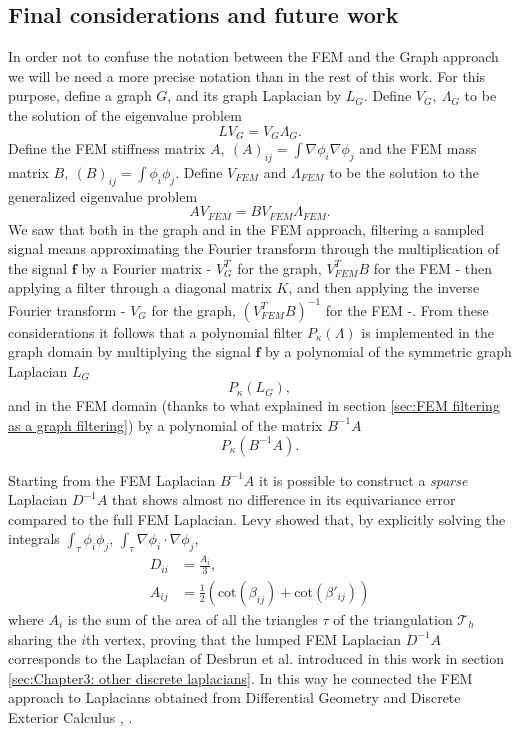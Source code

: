 \subsection{Final considerations and future work}
In order not to confuse the notation between the FEM and the Graph approach we will be need a more precise notation than in the rest of this work. For this purpose, define a graph $G$, and its graph Laplacian by $L_G$. Define $V_G,\ \Lambda_G$ to be the solution of the eigenvalue problem
$$
L V_G = V_G \Lambda_G.
$$
Define the FEM stiffness matrix $A,\ (A)_{ij} = \int\nabla\phi_i\nabla\phi_j$ and the FEM mass matrix $B,\ (B)_{ij} = \int\phi_i\phi_j$. Define $V_{FEM}$ and $\Lambda_{FEM}$ to be the solution to the generalized eigenvalue problem 
$$
AV_{FEM} = BV_{FEM}\Lambda_{FEM}.
$$
We saw that both in the graph and in the FEM approach, filtering a sampled signal means approximating the Fourier transform through the multiplication of the signal $\mathbf f$ by a Fourier matrix - $V_G^T$ for the graph, $V_{FEM}^TB$ for the FEM - then applying a filter through a diagonal matrix $K$, and then applying the inverse Fourier transform - $V_G$ for the graph, $(V_{FEM}^TB)^{-1}$ for the FEM -. From these considerations it follows that a polynomial filter $P_\kappa(\Lambda)$ is implemented in the graph domain by multiplying the signal $\mathbf f$ by a polynomial of the symmetric graph Laplacian $L_G$
$$
P_\kappa(L_G),
$$
and in the FEM domain (thanks to what explained in section \ref{sec:FEM filtering as a graph filtering}) by a polynomial of the matrix $B^{-1}A$
$$P_\kappa(B^{-1}A).
$$

Starting from the FEM Laplacian $B^{-1}A$ it is possible to construct a \textit{sparse} Laplacian $D^{-1}A$ that shows almost no difference in its equivariance error compared to the full FEM Laplacian. Levy \cite{levy} showed that, by explicitly solving the integrals $\int_\tau \phi_i \phi_j$, $\int_\tau \nabla \phi_i \cdot \nabla \phi_j$, 
$$\begin{aligned}
D_{ii} &= \frac{A_i}{3},\\
A_{ij} &= \frac{1}{2}\left(\text{cot}(\beta_{ij}) + \text{cot}(\beta'_{ij})\right)
\end{aligned}$$
where $A_i$ is the sum of the area of all the triangles $\tau$ of the triangulation $\mathcal T_h$ sharing the $i$th vertex, proving that the lumped FEM Laplacian $D^{-1}A$ corresponds to the Laplacian of Desbrun et al. \cite{Desbrun1999} introduced in this work in section \ref{sec:Chapter3: other discrete laplacians}. In this way he connected the FEM approach to Laplacians obtained from Differential Geometry and Discrete Exterior Calculus \cite{vallet}, \cite{meyer}.

